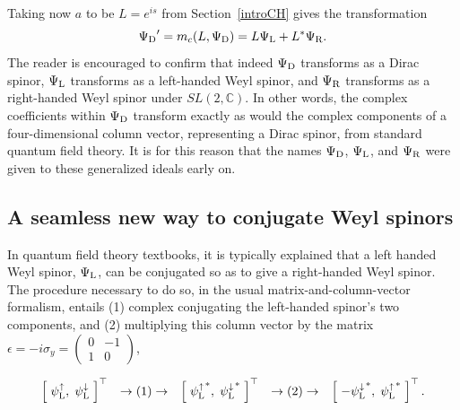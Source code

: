 \documentclass[letterpaper,12pt,titlepage,oneside,final]{book}
\begin{document}
Taking now $a$ to be $L = e^{is}$ from Section~\ref{introCH} gives the transformation
\begin{equation}
{\Psi_{\textup{D}}}' = m_c(L,\Psi_{\textup{D}} ) = L\Psi_{\textup{L}} + L^* \Psi_{\textup{R}}.
\end{equation}
\noindent The reader is encouraged to confirm that indeed $\Psi_{\textup{D}}$ transforms as a Dirac spinor, $\Psi_{\textup{L}}$ transforms as a left-handed Weyl spinor, and $\Psi_{\textup{R}}$ transforms as a right-handed Weyl spinor under $SL(2,\mathbb{C})$.  In other words, the complex coefficients within $\Psi_{\textup{D}}$ transform exactly as would the complex components of a four-dimensional column vector, representing a Dirac spinor, from standard quantum field theory.    It is for this reason that the names $\Psi_{\textup{D}}$, $\Psi_{\textup{L}}$, and $\Psi_{\textup{R}}$ were given to these generalized ideals early on.




\subsection{A seamless new way to conjugate Weyl spinors\label{lr}   }


In quantum field theory textbooks, it is typically explained that a left handed Weyl spinor, $\Psi_{\textup{L}}$, can be conjugated so as to give a right-handed Weyl spinor.  The procedure necessary to do so, in the usual matrix-and-column-vector formalism, entails (1) complex conjugating the left-handed spinor's two components, and (2) multiplying this column vector by the matrix $\epsilon = -i\sigma_y=\left( \begin{smallmatrix}0&-1\\1&0 \end{smallmatrix}  \right)$, 

\begin{equation}\label{old} \begin{array}{lllll}\left[\hspace{1mm}\psi^{\uparrow}_{\textup{L}} , \hspace{1mm} \psi^{\downarrow}_{\textup{L}}\hspace{1mm}\right]^{\top} &  \rightarrow (1) \rightarrow  & \left[\hspace{1mm}{\psi^{\uparrow}_{\textup{L}}}^* , \hspace{1mm} {\psi^{\downarrow}_{\textup{L}}}^*\hspace{1mm}\right]^{\top} & \rightarrow (2) \rightarrow & \left[\hspace{1mm}-{\psi^{\downarrow}_{\textup{L}}}^* , \hspace{1mm} {\psi^{\uparrow}_{\textup{L}}}^*\hspace{1mm}\right]^{\top}.
\end{array}\end{equation}
\end{document}
